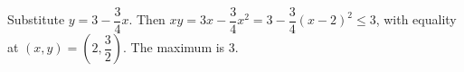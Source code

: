 Substitute $y=3-\dfrac{3}{4}x$. Then $xy=3x-\dfrac{3}{4}x^2=3-\dfrac{3}{4}(x-2)^2\le3$, with equality at $(x,y)=(2,\dfrac{3}{2})$. The maximum is $\boxed3$.
